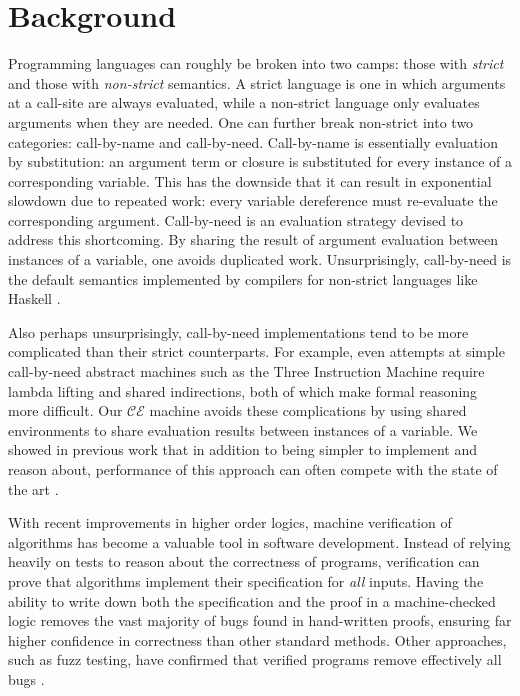 \section{Background} \label{sec:background}

Programming languages can roughly be broken into two camps: those with
\emph{strict} and those with \emph{non-strict} semantics. A strict language is
one in which arguments at a call-site are always evaluated, while a non-strict
language only evaluates arguments when they are needed. One can further break
non-strict into two categories: call-by-name and call-by-need. Call-by-name is
essentially evaluation by substitution: an argument term or closure is
substituted for every instance of a corresponding variable. This has the
downside that it can result in exponential slowdown due to repeated work: every
variable dereference must re-evaluate the corresponding argument. Call-by-need
is an evaluation strategy devised to address this shortcoming. By sharing the
result of argument evaluation between instances of a variable, one avoids
duplicated work.  Unsurprisingly, call-by-need is the default semantics
implemented by compilers for non-strict languages like Haskell \cite{jonesstg}. 

Also perhaps unsurprisingly, call-by-need implementations tend to be more
complicated than their strict counterparts. For example, even attempts at simple
call-by-need abstract machines such as the Three Instruction Machine \cite{TIM}
require lambda lifting and shared indirections, both of which make formal
reasoning more difficult. Our $\mathcal{CE}$ machine avoids these complications
by using shared environments to share evaluation results between instances of a
variable. We showed in previous work that in addition to being simpler to
implement and reason about, performance of this approach can often compete with
the state of the art \cite{cem}. 

With recent improvements in higher order logics, machine verification of
algorithms has become a valuable tool in software development. Instead of
relying heavily on tests to reason about the correctness of programs,
verification can prove that algorithms implement their specification for
\emph{all} inputs. Having the ability to write down both the specification and
the proof in a machine-checked logic removes the vast majority of bugs found in
hand-written proofs, ensuring far higher confidence in correctness than other
standard methods. Other approaches, such as fuzz testing, have confirmed that
verified programs remove effectively all bugs \cite{yangfuzz}.


